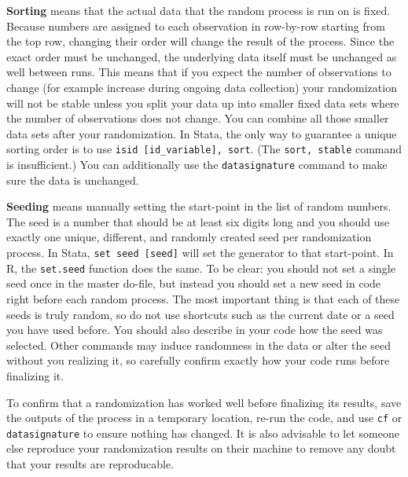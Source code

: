 \textbf{Sorting} means that the actual data that the random process is run on is fixed.
Because numbers are assigned to each observation in row-by-row starting from
the top row,
changing their order will change the result of the process.
Since the exact order must be unchanged, the underlying data itself must be unchanged as well between runs.
This means that if you expect the number of observations to change (for example increase during
ongoing data collection) your randomization will not be stable unless you split your data up into
smaller fixed data sets where the number of observations does not change. You can combine all
those smaller data sets after your randomization.
In Stata, the only way to guarantee a unique sorting order is to use
\texttt{isid [id\_variable], sort}. (The \texttt{sort, stable} command is insufficient.)
You can additionally use the \texttt{datasignature} command to make sure the
data is unchanged.

\textbf{Seeding} means manually setting the start-point in the list of random numbers.
The seed is a number that should be at least six digits long and you should use exactly
one unique, different, and randomly created seed per randomization process.
In Stata, \texttt{set seed [seed]} will set the generator to that start-point. In R, the \texttt{set.seed} function does the same.
To be clear: you should not set a single seed once in the master do-file,
but instead you should set a new seed in code right before each random process.
The most important thing is that each of these seeds is truly random,
so do not use shortcuts such as the current date or a seed you have used before.
You should also describe in your code how the seed was selected.
Other commands may induce randomness in the data or alter the seed without you realizing it,
so carefully confirm exactly how your code runs before finalizing it.


To confirm that a randomization has worked well before finalizing its results,
save the outputs of the process in a temporary location,
re-run the code, and use \texttt{cf} or \texttt{datasignature} to ensure
nothing has changed. It is also advisable to let someone else reproduce your
randomization results on their machine to remove any doubt that your results
are reproducable.

